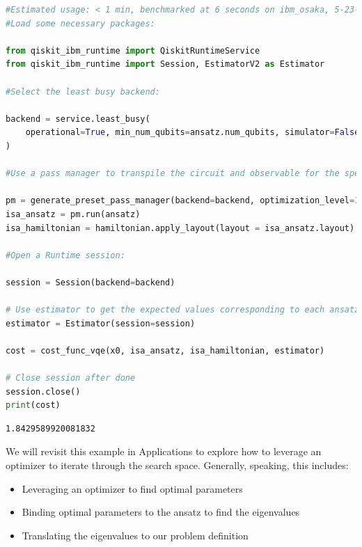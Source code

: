 \documentclass[12pt, oneside]{book}
\theoremstyle{definition}
\theoremstyle{definition}
\theoremstyle{remark}
\begin{document}
\begin{lstlisting}[language=Python]
#Estimated usage: < 1 min, benchmarked at 6 seconds on ibm_osaka, 5-23-24
#Load some necessary packages:

from qiskit_ibm_runtime import QiskitRuntimeService
from qiskit_ibm_runtime import Session, EstimatorV2 as Estimator

#Select the least busy backend:

backend = service.least_busy(
    operational=True, min_num_qubits=ansatz.num_qubits, simulator=False
)

#Use a pass manager to transpile the circuit and observable for the specific backend being used:

pm = generate_preset_pass_manager(backend=backend, optimization_level=1)
isa_ansatz = pm.run(ansatz)
isa_hamiltonian = hamiltonian.apply_layout(layout = isa_ansatz.layout)

#Open a Runtime session:

session = Session(backend=backend)

# Use estimator to get the expected values corresponding to each ansatz
estimator = Estimator(session=session)

cost = cost_func_vqe(x0, isa_ansatz, isa_hamiltonian, estimator)

# Close session after done
session.close()
print(cost)
\end{lstlisting}
\begin{lstlisting}
1.8429589920081832
\end{lstlisting}
We will revisit this example in Applications to explore how to leverage an optimizer to iterate through the search space. Generally, speaking, this includes:
\begin{itemize}
    \item Leveraging an optimizer to find optimal parameters
    \item Binding optimal parameters to the ansatz to find the eigenvalues
    \item Translating the eigenvalues to our problem definition
\end{itemize}
\end{document}
